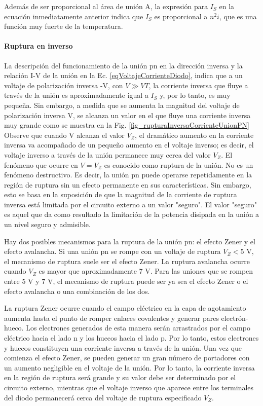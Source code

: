 Además de ser proporcional al área de unión A, la expresión para \(I_S\) en la ecuación inmediatamente anterior indica que \(I_S\) es proporcional a \(n^2i\), que es una función muy fuerte de la temperatura.

\paragraph*{Ruptura en inverso}

La descripción del funcionamiento de la unión pn en la dirección inversa y la relación I-V de la unión en la Ec. \ref{eqVoltajeCorrienteDiodo}, indica que a un voltaje de polarización inversa -V, con \( V \gg VT \), la corriente inversa que fluye a través de la unión es aproximadamente igual a \( I_S \) y, por lo tanto, es muy pequeña. Sin embargo, a medida que se aumenta la magnitud del voltaje de polarización inversa V, se alcanza un valor en el que fluye una corriente inversa muy grande como se muestra en la Fig. \ref{fig_rupturaInversaCorrienteUnionPN} Observe que cuando V alcanza el valor \( V_Z \), el dramático aumento en la corriente inversa va acompañado de un pequeño aumento en el voltaje inverso; es decir, el voltaje inverso a través de la unión permanece muy cerca del valor \( V_Z \). El fenómeno que ocurre en \( V = V_Z \) es conocido como ruptura de la unión. No es un fenómeno destructivo. Es decir, la unión pn puede operarse repetidamente en la región de ruptura sin un efecto permanente en sus características. Sin embargo, esto se basa en la suposición de que la magnitud de la corriente de ruptura inversa está limitada por el circuito externo a un valor "seguro". El valor "seguro" es aquel que da como resultado la limitación de la potencia disipada en la unión a un nivel seguro y admisible.

Hay dos posibles mecanismos para la ruptura de la unión pn: el efecto Zener y el efecto avalancha. Si una unión pn se rompe con un voltaje de ruptura \( V_Z < 5 \) V, el mecanismo de ruptura suele ser el efecto Zener. La ruptura avalancha ocurre cuando \( V_Z \) es mayor que aproximadamente 7 V. Para las uniones que se rompen entre 5 V y 7 V, el mecanismo de ruptura puede ser ya sea el efecto Zener o el efecto avalancha o una combinación de los dos.

La ruptura Zener ocurre cuando el campo eléctrico en la capa de agotamiento aumenta hasta el punto de romper enlaces covalentes y generar pares electrón-hueco. Los electrones generados de esta manera serán arrastrados por el campo eléctrico hacia el lado n y los huecos hacia el lado p. Por lo tanto, estos electrones y huecos constituyen una corriente inversa a través de la unión. Una vez que comienza el efecto Zener, se pueden generar un gran número de portadores con un aumento negligible en el voltaje de la unión. Por lo tanto, la corriente inversa en la región de ruptura será grande y su valor debe ser determinado por el circuito externo, mientras que el voltaje inverso que aparece entre los terminales del diodo permanecerá cerca del voltaje de ruptura especificado \( V_Z \).

